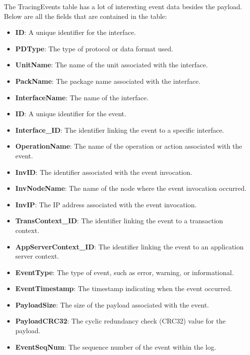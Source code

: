 \documentclass[12pt, times]{article}
\begin{document}
	The TracingEvents table has a lot of interesting event data besides the payload. Below are all the fields that are contained in the table:
	
	\begin{itemize}
		\item \textbf{ID}: A unique identifier for the interface.
		\item \textbf{PDType}: The type of protocol or data format used.
		\item \textbf{UnitName}: The name of the unit associated with the interface.
		\item \textbf{PackName}: The package name associated with the interface.
		\item \textbf{InterfaceName}: The name of the interface.
		\item \textbf{ID}: A unique identifier for the event.
		\item \textbf{Interface\_ID}: The identifier linking the event to a specific interface.
		\item \textbf{OperationName}: The name of the operation or action associated with the event.
		\item \textbf{InvID}: The identifier associated with the event invocation.
		\item \textbf{InvNodeName}: The name of the node where the event invocation occurred.
		\item \textbf{InvIP}: The IP address associated with the event invocation.
		\item \textbf{TransContext\_ID}: The identifier linking the event to a transaction context.
		\item \textbf{AppServerContext\_ID}: The identifier linking the event to an application server context.
		\item \textbf{EventType}: The type of event, such as error, warning, or informational.
		\item \textbf{EventTimestamp}: The timestamp indicating when the event occurred.
		\item \textbf{PayloadSize}: The size of the payload associated with the event.
		\item \textbf{PayloadCRC32}: The cyclic redundancy check (CRC32) value for the payload.
		\item \textbf{EventSeqNum}: The sequence number of the event within the log.
		
	\end{itemize}
	
\end{document}
